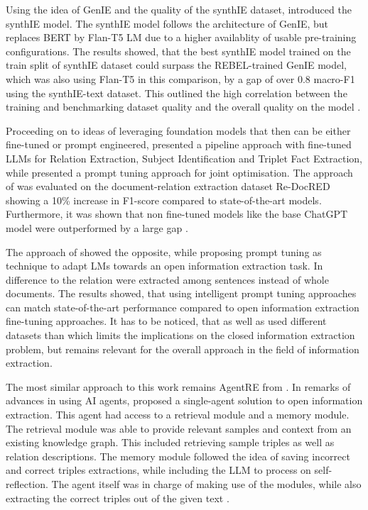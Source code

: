 \documentclass[a4paper,oneside,bibliography=totoc]{scrbook}
\begin{document}
Using the idea of GenIE and the quality of the synthIE dataset, \citet{Josifoski2023} introduced the synthIE model. The synthIE model follows the architecture of GenIE, but replaces BERT by Flan-T5 \ac{LM} due to a higher availablity of usable pre-training configurations. The results showed, that the best synthIE model trained on the train split of synthIE dataset could surpass the REBEL-trained GenIE model, which was also using Flan-T5 in this comparison, by a gap of over 0.8 macro-F1 using the synthIE-text dataset. This outlined the high correlation between the training and benchmarking dataset quality and the overall quality on the model \cite{Josifoski2023}.

Proceeding on to ideas of leveraging foundation models that then can be either fine-tuned or prompt engineered, \citet{Xue2024} presented a pipeline approach with fine-tuned \acp{LLM} for Relation Extraction, Subject Identification and Triplet Fact Extraction, while \citet{Chen2024} presented a prompt tuning approach for joint optimisation. The approach of \citet{Xue2024} was evaluated on the document-relation extraction dataset Re-DocRED showing a 10\% increase in F1-score compared to state-of-the-art models. Furthermore, it was shown that non fine-tuned models like the base ChatGPT model were outperformed by a large gap \cite{Xue2024}.

The approach of \citet{Chen2024} showed the opposite, while proposing prompt tuning as technique to adapt \acp{LM} towards an open information extraction task. In difference to \citet{Xue2024} the relation were extracted among sentences instead of whole documents. The results showed, that using intelligent prompt tuning approaches can match state-of-the-art performance compared to open information extraction fine-tuning approaches. It has to be noticed, that \citet{Chen2024} as well as \cite{Xue2024} used different datasets than \citet{Josifoski2023} which limits the implications on the closed information extraction problem, but remains relevant for the overall approach in the field of information extraction.

The most similar approach to this work remains AgentRE from \citet{Shi2024}. In remarks of advances in using \ac{AI} agents, \citet{Shi2024} proposed a single-agent solution to open information extraction. This agent had access to a retrieval module and a memory module. The retrieval module was able to provide relevant samples and context from an existing knowledge graph. This included retrieving sample triples as well as relation descriptions. The memory module followed the idea of saving incorrect and correct triples extractions, while including the \ac{LLM} to process on self-reflection. The agent itself was in charge of making use of the modules, while also extracting the correct triples out of the given text \cite{Shi2024}.
\end{document}
